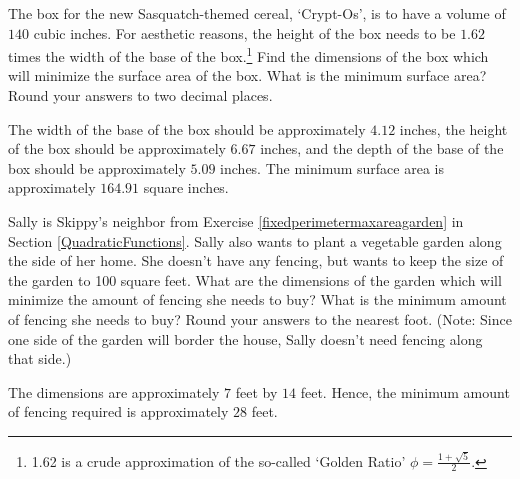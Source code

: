 \documentclass{ximera}
\begin{document}
\begin{problem}
The box for the new Sasquatch-themed cereal, `Crypt-Os', is to have a volume of $140$ cubic inches.  For aesthetic reasons, the height of the box needs to be $1.62$ times the width of the base of the box.\footnote{1.62 is a crude approximation of the so-called `Golden Ratio' $\phi = \frac{1 + \sqrt{5}}{2}$.}  Find the dimensions of the box which will minimize the surface area of the box.  What is the minimum surface area?  Round your answers to two decimal places. 

\begin{solution}
    The width of the base of the box should be approximately $4.12$ inches, the height of the box should be approximately $ 6.67$ inches, and the depth of the base of the box should be approximately $5.09$ inches. The minimum surface area is approximately $164.91$ square inches.
\end{solution}
\end{problem}   

\begin{problem}\label{fixedareaminperimetergarden} 
Sally is Skippy's neighbor from Exercise \ref{fixedperimetermaxareagarden} in Section \ref{QuadraticFunctions}.   Sally also wants to plant a vegetable garden along the side of her home.  She doesn't have any fencing, but wants to keep the size of the garden to 100 square feet.  What are the dimensions of the garden which will minimize the amount of fencing she needs to buy?  What is the minimum amount of fencing she needs to buy? Round your answers to the nearest foot. (Note:  Since one side of the garden will border the house, Sally doesn't need fencing along that side.)

\begin{solution}
    The dimensions are  approximately  $7$ feet by $14$ feet.  Hence, the minimum amount of fencing required is approximately  $28$ feet.
\end{solution}
\end{problem}
\end{document}
